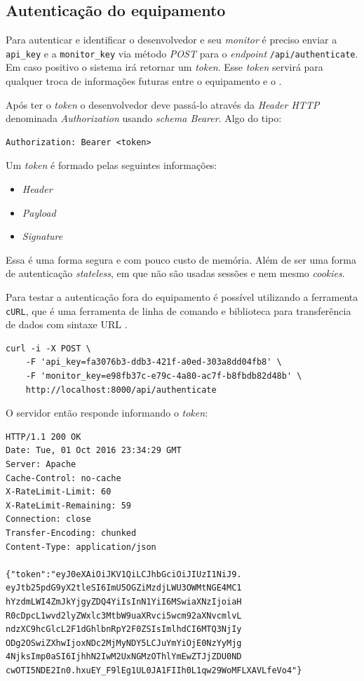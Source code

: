 \subsection{Autenticação do
equipamento}\label{autenticauxe7uxe3o-do-equipamento}

Para autenticar e identificar o desenvolvedor e seu \emph{monitor} é
preciso enviar a \texttt{api\_key} e a \texttt{monitor\_key} via método
\emph{POST} para o \emph{endpoint} \texttt{/api/authenticate}. Em caso
positivo o sistema irá retornar um \emph{token}. Esse \emph{token}
servirá para qualquer troca de informações futuras entre o equipamento
\iot e o \wm.

Após ter o \emph{token} o desenvolvedor deve passá-lo através da
\emph{Header HTTP} denominada \emph{Authorization} usando \emph{schema
Bearer}. Algo do tipo:

\begin{verbatim}
Authorization: Bearer <token>
\end{verbatim}

Um \emph{token} é formado pelas seguintes informações:

\begin{itemize}
\itemsep1pt\parskip0pt
\item
  \emph{Header}
\item
  \emph{Payload}
\item
  \emph{Signature}
\end{itemize}

Essa é uma forma segura e com pouco custo de memória. Além de ser uma
forma de autenticação \emph{stateless}, em que não são usadas sessões e
nem mesmo \emph{cookies}.

Para testar a autenticação fora do equipamento \iot é possível
utilizando a ferramenta \texttt{cURL}, que é uma ferramenta de linha de
comando e biblioteca para transferência de dados com sintaxe URL
\cite{curl:1996}.

\begin{verbatim}
curl -i -X POST \
    -F 'api_key=fa3076b3-ddb3-421f-a0ed-303a8dd04fb8' \
    -F 'monitor_key=e98fb37c-e79c-4a80-ac7f-b8fbdb82d48b' \
    http://localhost:8000/api/authenticate
\end{verbatim}

O servidor então responde informando o \emph{token}:

\begin{verbatim}
HTTP/1.1 200 OK
Date: Tue, 01 Oct 2016 23:34:29 GMT
Server: Apache
Cache-Control: no-cache
X-RateLimit-Limit: 60
X-RateLimit-Remaining: 59
Connection: close
Transfer-Encoding: chunked
Content-Type: application/json

{"token":"eyJ0eXAiOiJKV1QiLCJhbGciOiJIUzI1NiJ9.
eyJtb25pdG9yX2tleSI6ImU5OGZiMzdjLWU3OWMtNGE4MC1
hYzdmLWI4ZmJkYjgyZDQ4YiIsInN1YiI6MSwiaXNzIjoiaH
R0cDpcL1wvd2lyZWxlc3MtbW9uaXRvci5wcm92aXNvcmlvL
ndzXC9hcGlcL2F1dGhlbnRpY2F0ZSIsImlhdCI6MTQ3NjIy
ODg2OSwiZXhwIjoxNDc2MjMyNDY5LCJuYmYiOjE0NzYyMjg
4NjksImp0aSI6IjhhN2IwM2UxNGMzOThlYmEwZTJjZDU0ND
cwOTI5NDE2In0.hxuEY_F9lEg1UL0JA1FIIh0L1qw29WoMFLXAVLfeVo4"}
\end{verbatim}

